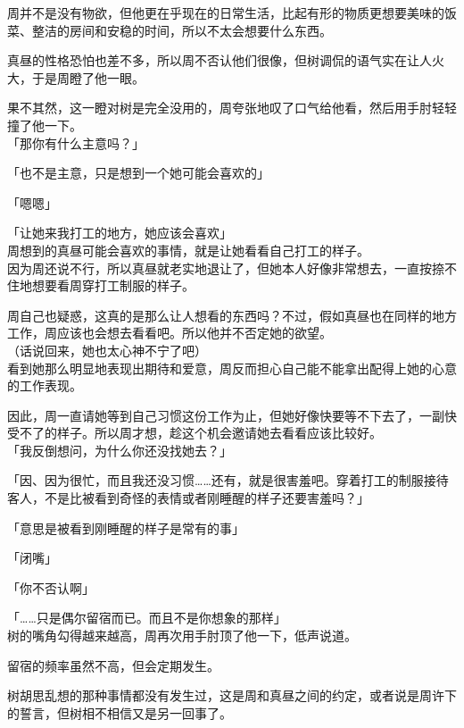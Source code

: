周并不是没有物欲，但他更在乎现在的日常生活，比起有形的物质更想要美味的饭菜、整洁的房间和安稳的时间，所以不太会想要什么东西。

真昼的性格恐怕也差不多，所以周不否认他们很像，但树调侃的语气实在让人火大，于是周瞪了他一眼。

果不其然，这一瞪对树是完全没用的，周夸张地叹了口气给他看，然后用手肘轻轻撞了他一下。\\

「那你有什么主意吗？」

「也不是主意，只是想到一个她可能会喜欢的」

「嗯嗯」

「让她来我打工的地方，她应该会喜欢」\\

周想到的真昼可能会喜欢的事情，就是让她看看自己打工的样子。\\

因为周还说不行，所以真昼就老实地退让了，但她本人好像非常想去，一直按捺不住地想要看周穿打工制服的样子。

周自己也疑惑，这真的是那么让人想看的东西吗？不过，假如真昼也在同样的地方工作，周应该也会想去看看吧。所以他并不否定她的欲望。\\

（话说回来，她也太心神不宁了吧）\\

看到她那么明显地表现出期待和爱意，周反而担心自己能不能拿出配得上她的心意的工作表现。

因此，周一直请她等到自己习惯这份工作为止，但她好像快要等不下去了，一副快受不了的样子。所以周才想，趁这个机会邀请她去看看应该比较好。\\

「我反倒想问，为什么你还没找她去？」

「因、因为很忙，而且我还没习惯……还有，就是很害羞吧。穿着打工的制服接待客人，不是比被看到奇怪的表情或者刚睡醒的样子还要害羞吗？」

「意思是被看到刚睡醒的样子是常有的事」

「闭嘴」

「你不否认啊」

「……只是偶尔留宿而已。而且不是你想象的那样」\\

树的嘴角勾得越来越高，周再次用手肘顶了他一下，低声说道。

留宿的频率虽然不高，但会定期发生。

树胡思乱想的那种事情都没有发生过，这是周和真昼之间的约定，或者说是周许下的誓言，但树相不相信又是另一回事了。\\

